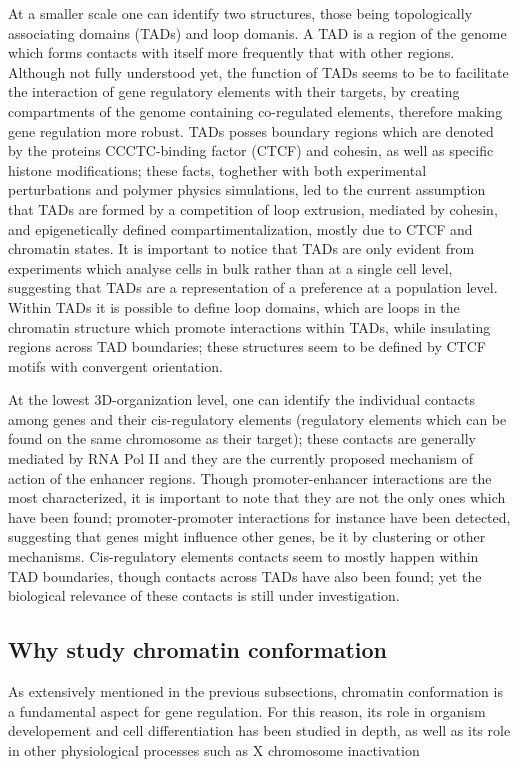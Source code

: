 At a smaller scale one can identify two structures, those being topologically associating domains (TADs) and loop domanis. A TAD is a region of the genome which forms contacts with itself more frequently that with other regions. Although not fully understood yet, the function of TADs seems to be to facilitate the interaction of gene regulatory elements with their targets, by creating compartments of the genome containing co-regulated elements, therefore making gene regulation more robust\cite{tadrole2018}. TADs posses boundary regions which are denoted by the proteins CCCTC-binding factor (CTCF) and cohesin, as well as specific histone modifications\cite{chromatindevelopment2019}; these facts, toghether with both experimental perturbations and polymer physics simulations, led to the current assumption that TADs are formed by a competition of loop extrusion, mediated by cohesin, and epigenetically defined compartimentalization, mostly due to CTCF and chromatin states\cite{tadformation2018}. It is important to notice that TADs are only evident from experiments which analyse cells in bulk rather than at a single cell level, suggesting that TADs are a representation of a preference at a population level\cite{chromatinorganization2019}. Within TADs it is possible to define loop domains, which are loops in the chromatin structure which promote interactions within TADs, while insulating regions across TAD boundaries; these structures seem to be defined by CTCF motifs with convergent orientation\cite{chromatindevelopment2019}.

At the lowest 3D-organization level, one can identify the individual contacts among genes and their cis-regulatory elements (regulatory elements which can be found on the same chromosome as their target); these contacts are generally mediated by RNA Pol II and they are the currently proposed mechanism of action of the enhancer regions\cite{chromatinorganization2019}. Though promoter-enhancer interactions are the most characterized, it is important to note that they are not the only ones which have been found; promoter-promoter interactions for instance have been detected, suggesting that genes might influence other genes, be it by clustering or other mechanisms\cite{geneinteractions2016}. Cis-regulatory elements contacts seem to mostly happen within TAD boundaries, though contacts across TADs have also been found; yet the biological relevance of these contacts is still under investigation\cite{longrange2015}.

\subsection{Why study chromatin conformation}
As extensively mentioned in the previous subsections, chromatin conformation is a fundamental aspect for gene regulation. For this reason, its role in organism developement and cell differentiation has been studied in depth\cite{chromatindevelopment2019}, as well as its role in other physiological processes such as X chromosome inactivation\cite{xsilencing2017}

